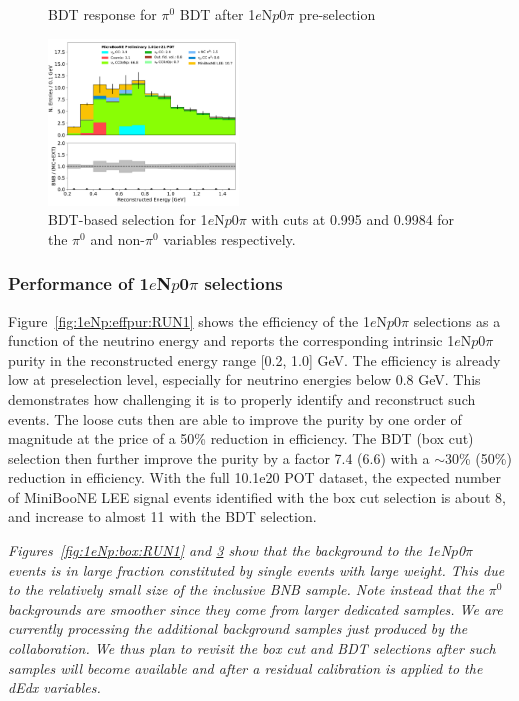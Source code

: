 \documentclass[a4paper]{article}
\newcommand{\npsel}{1$e$N$p$0$\pi$ }
\begin{document}
\begin{figure}[H]
\begin{center}
\begin{subfigure}[b]{0.45\textwidth}
    \caption{\label{fig:1eNp:bdt:pi0:zoom}}
    \end{subfigure}
\caption{\label{fig:1eNp:bdt:pi0}BDT response for $\pi^0$ BDT after \npsel pre-selection}
\end{center}
\end{figure}

\begin{figure}[H]
\begin{center}
\includegraphics[width=0.45\textwidth]{1eNp/reco_e_01162020_bdt_RUN1.pdf}
\caption{\label{fig:1eNp:bdt:RUN1}BDT-based selection for \npsel with cuts at 0.995 and 0.9984 for the $\pi^0$ and non-$\pi^0$ variables respectively.}
\end{center}
\end{figure}

\subsubsection{Performance of \npsel selections}

Figure~\ref{fig:1eNp:effpur:RUN1} shows the efficiency of the \npsel selections as a function of the neutrino energy and reports the corresponding intrinsic \npsel purity in the reconstructed energy range [0.2, 1.0] \si{\GeV}. The efficiency is already low at preselection level, especially for neutrino energies below 0.8 \si{\GeV}. This demonstrates how challenging it is to properly identify and reconstruct such events. The loose cuts then are able to improve the purity by one order of magnitude at the price of a 50\% reduction in efficiency. The BDT (box cut) selection then further improve the purity by a factor 7.4 (6.6) with a $\sim$30\% (50\%) reduction in efficiency. With the full 10.1e20 POT dataset, the expected number of MiniBooNE LEE signal events identified with the box cut selection is about 8, and increase to almost 11 with the BDT selection.

\emph{Figures~\ref{fig:1eNp:box:RUN1} and \ref{fig:1eNp:bdt:RUN1} show that the background to the \npsel events is in large fraction constituted by single events with large weight. This due to the relatively small size of the inclusive BNB sample. Note instead that the $\pi^0$ backgrounds are smoother since they come from larger dedicated samples. We are currently processing the additional background samples just produced by the collaboration. We thus plan to revisit the box cut and BDT selections after such samples will become available and after a residual calibration is applied to the dEdx variables.}
\end{document}
